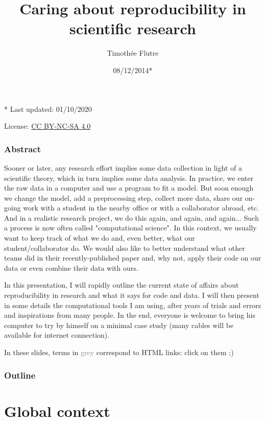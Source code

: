 \documentclass[c]{beamer} %
\title[Reproducible research]{Caring about reproducibility in scientific research}
\author[T. Flutre]{Timoth\'{e}e Flutre}
\institute[INRA]{INRA, UMR AGAP (now at INRAE, UMR GQE)}
\date{08/12/2014*}
\begin{document}
\begin{frame}
  \titlepage
  
  \tiny
  \begin{center}
    * Last updated: 01/10/2020
    
    \medskip
    
    License: \href{http://creativecommons.org/licenses/by-nc-sa/4.0/}{CC BY-NC-SA 4.0}
  \end{center}
\end{frame}                                                                                                                       
\begin{frame}
  \frametitle{Abstract}
  \tiny
  Sooner or later, any research effort implies some data collection in light of a scientific theory, which in turn implies some data analysis. In practice, we enter the raw data in a computer and use a program to fit a model. But soon enough we change the model, add a preprocessing step, collect more data, share our on-going work with a student in the nearby office or with a collaborator abroad, etc. And in a realistic research project, we do this again, and again, and again... Such a process is now often called "computational science". In this context, we usually want to keep track of what we do and, even better, what our student/collaborator do. We would also like to better understand what other teams did in their recently-published paper and, why not, apply their code on our data or even combine their data with ours.
  
  \medskip
  
  In this presentation, I will rapidly outline the current state of affairs about reproducibility in research and what it says for code and data. I will then present in some details the computational tools I am using, after years of trials and errors and inspirations from many people. In the end, everyone is welcome to bring his computer to try by himself on a minimal case study (many cables will be available for internet connection).
  
  \bigskip
  
  In these slides, terms in \textcolor{gray}{grey} correspond to HTML links: click on them ;)
\end{frame}

\begin{frame}
  \frametitle{Outline}
  \tableofcontents
\end{frame}

\section{Global context}
\end{document}
